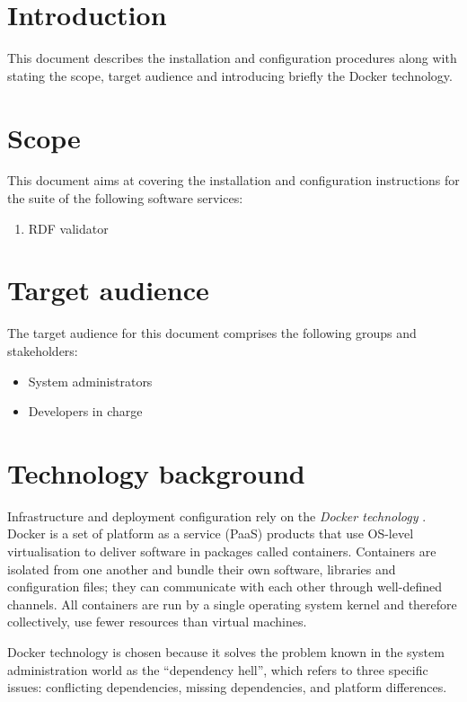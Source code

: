 \section{Introduction}
\label{sec:introduction}	
    
    This document describes the installation and configuration procedures along with stating the scope, target audience and introducing briefly the Docker technology.
    
\section{Scope}
\label{sec:scope}

	This document aims at covering the installation and configuration instructions for the suite of the following software services:
	
	\begin{enumerate}
		\item RDF validator
	\end{enumerate}

\section{Target audience}
\label{sec:audience}
	
	The target audience for this document comprises the following groups and stakeholders:	
	\begin{itemize}
		\item System administrators
		\item Developers in charge
	\end{itemize}	
		
\section{Technology background}
\label{sec:background}

	Infrastructure and deployment configuration rely on the \textit{Docker technology} \citep{docker-merkel2014docker, docker}. Docker is a set of platform as a service (PaaS) products that use OS-level virtualisation to deliver software in packages called containers. Containers are isolated from one another and bundle their own software, libraries and configuration files; they can communicate with each other through well-defined channels. All containers are run by a single operating system kernel and therefore collectively, use fewer resources than virtual machines.

	Docker technology is chosen because it solves the problem known in the system administration world as the ``dependency hell'', which refers to three specific issues: conflicting dependencies, missing dependencies, and platform differences.

